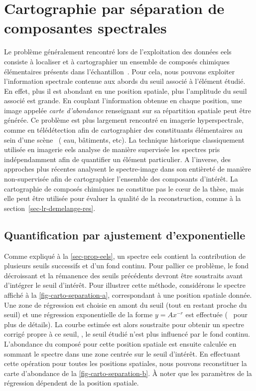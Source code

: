    

    \section{Cartographie par séparation de composantes spectrales}\label{sec-exploitation-eels}

    Le problème généralement rencontré lors de l'exploitation des données \gls{eels} consiste à localiser et à cartographier un ensemble de composés chimiques élémentaires présents dans l'échantillon~\cite{colliex2012stem, pennycook2011seeing, dobigeon2012spectral}.
    Pour cela, nous pouvons exploiter l'information spectrale contenue aux abords du seuil associé à l'élément étudié. En effet, plus il est abondant en une position spatiale, plus l'amplitude du seuil associé est grande. En couplant l'information obtenue en chaque position, une image appelée \emph{carte d'abondance} renseignant sur sa répartition spatiale peut être générée. 
    Ce problème est plus largement rencontré en imagerie hyperspectrale, comme en télédétection afin de cartographier des constituants élémentaires au sein d'une scène~\cite{lelong1998hyperspectral} (\eg{} eau, bâtiments, etc).
    La technique historique classiquement utilisée en imagerie \gls{eels} analyse de manière supervisée les spectres pris indépendamment afin de quantifier un élément particulier.
    A l'inverse, des approches plus récentes analysent le spectre-image dans son entièreté de manière non-supervisée afin de cartographier l'ensemble des composants d'intérêt. 
    La cartographie de composés chimiques ne constitue pas le c\oe{}ur de la thèse, mais elle peut être utilisée pour évaluer la qualité de la reconstruction, comme à la section~\ref{sec-lr-demelange-res}.


    \subsection{Quantification par ajustement d'exponentielle}
    
    Comme expliqué à la \cref{sec-prop-eels}, un spectre \gls{eels} contient la contribution de plusieurs seuils successifs et d'un fond continu. Pour pallier ce problème, le fond décroissant et la rémanence des seuils précédents devront être soustraits avant d'intégrer le seuil d'intérêt. Pour illustrer cette méthode, considérons le spectre affiché à la \cref{fig-carto-separation-a}, correspondant à une position spatiale donnée. Une zone de régression est choisie en amont du seuil (tout en restant proche du seuil) et une régression exponentielle de la forme $y=Ax^{-r}$ est effectuée (\cf{}~\cite[Section~4.4]{egerton2011electron} pour plus de détails). La courbe estimée est alors soustraite pour obtenir un spectre corrigé propre à ce seuil, \ie{}, le seuil étudié n'est plus influencé par le fond continu. L'abondance du composé pour cette position spatiale est ensuite calculée en sommant le spectre dans une zone centrée sur le seuil d'intérêt. En effectuant cette opération pour toutes les positions spatiales, nous pouvons reconstituer la carte d'abondance de la \cref{fig-carto-separation-b}. \`A noter que les paramètres de la régression dépendent de la position spatiale.

